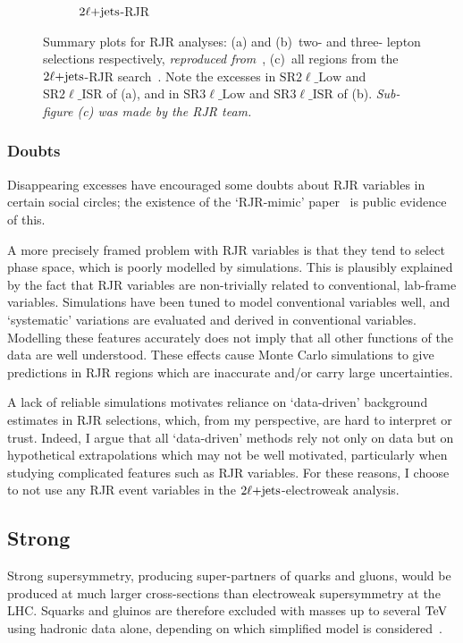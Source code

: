 \begin{figure}[tp]
\begin{subfigure}{0.8\textwidth}
  \caption{$\twoljets$-RJR~\cite{atlas2022searches}}
\end{subfigure}
\caption{%
Summary plots for RJR analyses:
(a) and (b)~two- and three- lepton selections respectively,
\emph{reproduced from}~\cite{atlas_rjr_23l_SUSY_2017_03},
(c)~all regions from the $\twoljets$-RJR search~\cite{atlas2022searches}.
Note the excesses in
$\mathrm{SR}2\ell\_\mathrm{Low}$ and $\mathrm{SR}2\ell\_\mathrm{ISR}$ of (a),
and in
$\mathrm{SR}3\ell\_\mathrm{Low}$ and $\mathrm{SR}3\ell\_\mathrm{ISR}$ of (b).
\emph{Sub-figure (c) was made by the RJR team.}
}
\label{fig:2ljets_rjr_summaries}
\end{figure}


\subsubsection{Doubts}
Disappearing excesses have encouraged some doubts about RJR variables in
certain social circles;
the existence of the `RJR-mimic' paper~\cite{atlas_rjr_mimic_SUSY_2018_06}
is public evidence of this.

A more precisely framed problem with RJR variables is that they tend to select
phase space, which is poorly modelled by simulations.
This is plausibly explained by the fact that RJR variables are non-trivially
related to conventional, lab-frame variables.
Simulations have been tuned to model conventional variables well, and
`systematic' variations are evaluated and derived in conventional variables.
Modelling these features accurately does not imply that all other functions of
the data are well understood.
These effects cause Monte Carlo simulations to give predictions in RJR regions
which are inaccurate and/or carry large uncertainties.

A lack of reliable simulations motivates reliance on `data-driven' background
estimates in RJR selections, which, from my perspective, are hard to interpret
or trust.
Indeed, I argue that all `data-driven' methods rely not only on data but on
hypothetical extrapolations which may not be well motivated, particularly when
studying complicated features such as RJR variables.
For these reasons, I choose to not use any RJR event variables in the
$\twoljets$-electroweak analysis.


\subsection{Strong}
\label{sec:2ljets_origins_strong}
Strong supersymmetry, producing super-partners of quarks and gluons, would be
produced at much larger cross-sections than electroweak supersymmetry at the
LHC.
Squarks and gluinos are therefore excluded with masses up to several
$\eV[T]$ using hadronic data alone, depending on which simplified model is
considered~\cite{atlas_susy_strong_0l}.

